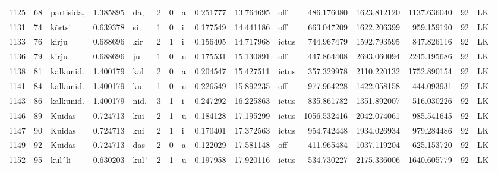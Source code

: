 \begin{tabular}{lrlrllllrrlrrrll}
1125 &          68 &       partisida, &  1.385895 &     da, &        2 &      0 &       a &      0.251777 &     13.764695 &    off &   486.176080 &  1623.812120 &  1137.636040 &     92 &        LK \\
1131 &          74 &           kõrtsi &  0.639378 &      si &        1 &      0 &       i &      0.177549 &     14.441186 &    off &   663.047209 &  1622.206399 &   959.159190 &     92 &        LK \\
1133 &          76 &            kirju &  0.688696 &     kir &        2 &      1 &       i &      0.156405 &     14.717968 &  ictus &   744.967479 &  1592.793595 &   847.826116 &     92 &        LK \\
1136 &          79 &            kirju &  0.688696 &      ju &        1 &      0 &       u &      0.175531 &     15.130891 &    off &   447.864408 &  2693.060094 &  2245.195686 &     92 &        LK \\
1138 &          81 &        kalkunid. &  1.400179 &     kal &        2 &      0 &       a &      0.204547 &     15.427511 &  ictus &   357.329978 &  2110.220132 &  1752.890154 &     92 &        LK \\
1141 &          84 &        kalkunid. &  1.400179 &      ku &        1 &      0 &       u &      0.226549 &     15.892235 &    off &   977.964228 &  1422.058158 &   444.093931 &     92 &        LK \\
1143 &          86 &        kalkunid. &  1.400179 &    nid. &        3 &      1 &       i &      0.247292 &     16.225863 &  ictus &   835.861782 &  1351.892007 &   516.030226 &     92 &        LK \\
1146 &          89 &           Kuidas &  0.724713 &     kui &        2 &      1 &       u &      0.184128 &     17.195299 &  ictus &  1056.532416 &  2042.074061 &   985.541645 &     92 &        LK \\
1147 &          90 &           Kuidas &  0.724713 &     kui &        2 &      1 &       i &      0.170401 &     17.372563 &  ictus &   954.742448 &  1934.026934 &   979.284486 &     92 &        LK \\
1149 &          92 &           Kuidas &  0.724713 &     das &        2 &      0 &       a &      0.122029 &     17.581148 &    off &   411.965484 &  1037.119204 &   625.153720 &     92 &        LK \\
1152 &          95 &           kul´li &  0.630203 &    kul´ &        2 &      1 &       u &      0.197958 &     17.920116 &  ictus &   534.730227 &  2175.336006 &  1640.605779 &     92 &        LK \\

\end{tabular}
